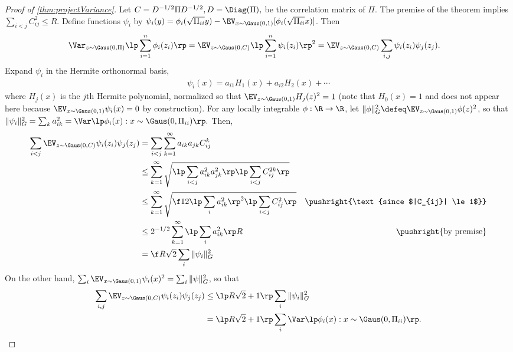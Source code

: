 \documentclass[main.tex]{subfiles}
\begin{document}
\begin{proof}[Proof of \cref{thm:projectVariance}]
Let $C = D^{-1/2} \Pi D^{-1/2}, D = \Diag(\Pi),$ be the correlation matrix of $\Pi$.
The premise of the theorem implies $\sum_{i<j} C_{ij}^2 \le R$.
Define functions $\psi_i$ by $\psi_i(y) = \phi_i(\sqrt{\Pi_{ii}}y) - \EV_{x \sim \Gaus(0, 1)}[\phi_i(\sqrt{\Pi_{ii}}x)]$.
Then
\begin{align*}
\Var_{z \sim \Gaus(0, \Pi)}\lp \sum_{i=1}^n \phi_i(z_i) \rp
    &=
        \EV_{z \sim \Gaus(0, C)}
            \lp \sum_{i=1}^n \psi_i(z_i) \rp^2
    =
        \EV_{z \sim \Gaus(0, C)}
            \sum_{i,j} \psi_i(z_i) \psi_j(z_j).
\end{align*}
Expand $\psi_i$ in the Hermite orthonormal basis,
\begin{align*}
    \psi_i(x) = a_{i1} H_1(x) + a_{i2} H_2(x) + \cdots
\end{align*}
where $H_j(x)$ is the $j$th Hermite polynomial, normalized so that $\EV_{z \sim \Gaus(0, 1)} H_j(z)^2 = 1$ (note that $H_0(x) = 1$ and does not appear here because $\EV_{x \sim \Gaus(0, 1)}\psi_i(x) = 0$ by construction).
For any locally integrable $\phi: \R \to \R$, let $\|\phi\|_G^2 \defeq \EV_{z \sim \Gaus(0, 1)} \phi(z)^2$, so that $\|\psi_i\|_G^2 = \sum_k a_{ik}^2 = \Var\lp \phi_i(x) : x \sim \Gaus(0, \Pi_{ii})\rp.$
Then,
\begin{align*}
    \sum_{i < j} \EV_{z \sim \Gaus(0, C)} \psi_i(z_i) \psi_j(z_j)
        &=
            \sum_{i<j} \sum_{k=1}^\infty a_{ik} a_{jk} C_{ij}^k
            \\
        &\le
            \sum_{k=1}^\infty \sqrt{\lp \sum_{i<j} a_{ik}^2 a_{jk}^2\rp
                                    \lp \sum_{i<j} C_{ij}^{2k}\rp}
            \\
        &\le
            \sum_{k=1}^\infty \sqrt{\f 1 2 \lp \sum_{i} a_{ik}^2\rp^2
                                    \lp \sum_{i<j} C_{ij}^2\rp}
        &
            \pushright{\text{since $|C_{ij}| \le 1$}}
            \\
        &\le
            2^{-1/2}\sum_{k=1}^\infty \lp \sum_{i} a_{ik}^2\rp R
        &
            \pushright{\text{by premise}}
            \\
        &=
            \f R {\sqrt 2} \sum_i \|\psi_i\|_G^2
\end{align*}
On the other hand, $\sum_i \EV_{x \sim \Gaus(0, 1)} \psi_i(x)^2 = \sum_i \|\psi\|_G^2$, so that
\begin{align*}
    \sum_{i,j}\EV_{z \sim \Gaus(0, C)} \psi_i(z_i) \psi_j(z_j)
        &\le
            \lp R \sqrt 2 + 1 \rp \sum_i \|\psi_i\|_G^2
            \\
        &=
            \lp R \sqrt 2 + 1 \rp \sum_i \Var\lp \phi_i(x) : x \sim \Gaus(0, \Pi_{ii})\rp.
\end{align*}

\end{proof}
\end{document}
